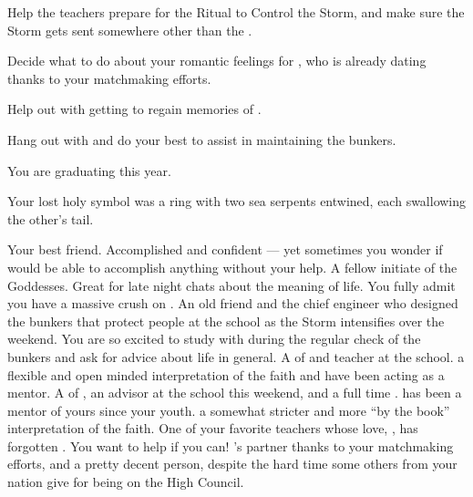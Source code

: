 \documentclass[char]{GL2020}
\begin{document}
\begin{itemz}
    \item Help the teachers prepare for the Ritual to Control the Storm, and make sure the Storm gets sent somewhere other than the \pShip{}.
    \item Decide what to do about your romantic feelings for \cWarlordDaughter{}, who is already dating \cTechStar{} thanks to your matchmaking efforts.
    \item Help \cChupAvenger{} out with getting \cHeadScientist{} to regain \cHeadScientist{\their} memories of \cChupAvenger{}.
    \item Hang out with \cBunker{} and do your best to assist \cBunker{\them} in maintaining the bunkers.
\end{itemz}

\begin{itemz}[Notes]
    \item You are graduating this year.
    \item Your lost holy symbol was a ring with two sea serpents entwined, each swallowing the other's tail.
\end{itemz}

\begin{contacts}
    \contact{\cPresident{}} Your best friend. Accomplished and confident — yet sometimes you wonder if \cPresident{\they} would be able to accomplish anything without your help.
    \contact{\cWarlordDaughter{}} A fellow initiate of the Goddesses. Great for late night chats about the meaning of life. You fully admit you have a massive crush on \cWarlordDaughter{\them}. 
    \contact{\cBunker{}} An old friend and the chief engineer who designed the bunkers that protect people at the school as the Storm intensifies over the weekend. You are so excited to study with \cBunker{\them} during the regular check of the bunkers and ask for \cBunker{\their} advice about life in general.
    \contact{\cFlowPriest{}} A \cFlowPriest{\cleric} of \cFlow{} and teacher at the school. \cFlowPriest{\Theyhave} a flexible and open minded interpretation of the faith and have been acting as a mentor.
    \contact{\cEbbPriest{}} A \cEbbPriest{\cleric} of \cEbb{}, an advisor at the school this weekend, and a full time \cEbbPriest{\cleric}. \cEbbPriest{} has been a mentor of yours since your youth. \cEbbPriest{\Theyhave} a somewhat stricter and more ``by the book'' interpretation of the faith.
    \contact{\cChupAvenger{}} One of your favorite teachers whose love, \cHeadScientist{}, has forgotten \cChupAvenger{\them}. You want to help if you can!
    \contact{\cTechStar{}} \cWarlordDaughter{}’s partner thanks to your matchmaking efforts, and a pretty decent person, despite the hard time some others from your nation give \cTechStar{\them} for being on the \pTech{} High Council.
\end{contacts}
\end{document}
